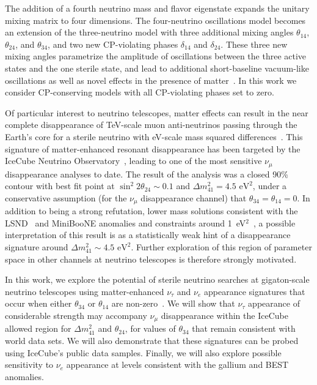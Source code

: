 \documentclass[main.tex]{subfiles}
\begin{document}
The addition of a fourth neutrino mass and flavor eigenstate expands the unitary mixing matrix to four dimensions. The four-neutrino oscillations model becomes an extension of the three-neutrino model with three additional mixing angles $\theta_{14}$, $\theta_{24}$, and $\theta_{34}$, and two new CP-violating phases $\delta_{14}$ and $\delta_{24}$. These three new mixing angles parametrize the amplitude of oscillations between the three active states and the one sterile state, and lead to additional short-baseline vacuum-like oscillations as well as novel effects in the presence of matter~\cite{Akhmedov:1988kd,KRASTEV1989341,Chizhov:1998ug, Chizhov_1999, Akhmedov_2000}.  In this work we consider CP-conserving models with all CP-violating phases set to zero.


Of particular interest to neutrino telescopes, matter effects can result in the near complete disappearance of TeV-scale muon anti-neutrinos passing through the Earth's core for a sterile neutrino with eV-scale mass squared differences~\cite{Nunokawa:2003ep, Petcov:2016iiu, Choubey:2007ji, Barger:2011rc, Esmaili:2012nz, esmaili2013restricting, Lindner:2015iaa}. This signature of matter-enhanced resonant disappearance has been targeted by the IceCube Neutrino Observatory~\cite{Aartsen_2020, Aartsen_2020_prd}, leading to one of the  most sensitive $\nu_\mu$ disappearance analyses to date. The result of the analysis was a closed 90\% contour with best fit point at $\sin^2 2\theta_{24}\sim0.1$ and $\Delta m^2_{41}=4.5\text{ eV}^2$, under a conservative assumption (for the $\nu_\mu$ disappearance channel) that $\theta_{34}=\theta_{14}=0$. In addition to being a strong refutation, lower mass solutions consistent with the LSND~\cite{Athanassopoulos_1998} and MiniBooNE anomalies and constraints around 1~eV$^2$~\cite{kopp2013sterile, Cirelli:2004cz, abazajian2012light, Gariazzo:2017fdh, Dentler:2017tkw, Diaz:2019fwt}, a possible interpretation of this result is as a statistically weak hint of a disappearance signature around $\Delta m^2_{41}\sim4.5\text{ eV}^2$.  Further exploration of this region of parameter space  in other channels at neutrino telescopes is therefore strongly motivated. 

In this work, we explore the potential of sterile neutrino searches at gigaton-scale neutrino telescopes using matter-enhanced $\nu_\tau$ and $\nu_e$  appearance signatures that occur when either $\theta_{34}$ or $\theta_{14}$ are non-zero~\cite{esmaili2013}. We will show that $\nu_\tau$ appearance of considerable strength may accompany $\nu_\mu$ disappearance within the IceCube allowed region for $\Delta m^2_{41}$ and $\theta_{24}$, for values of $\theta_{34}$ that remain consistent with world data sets.  We will also demonstrate that these signatures can be probed using IceCube's public data samples.  Finally, we will also explore possible sensitivity to $\nu_e$ appearance at levels consistent with the gallium and BEST anomalies.
\end{document}

